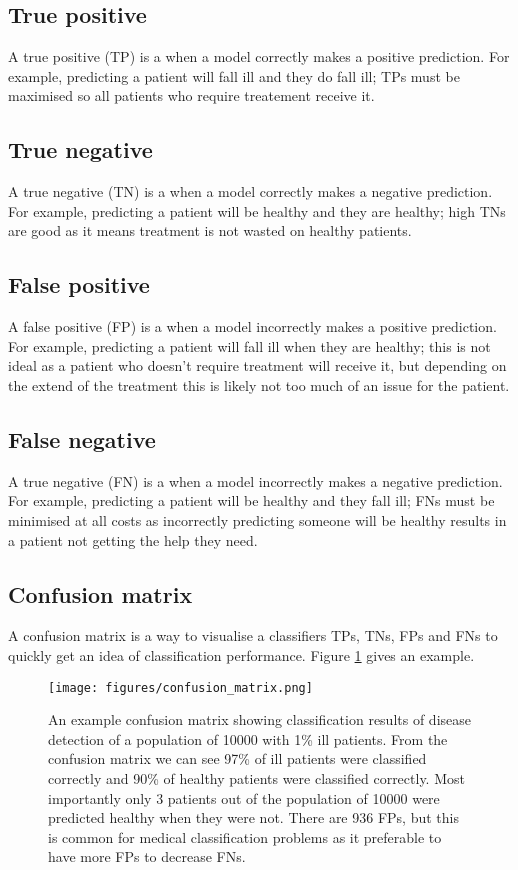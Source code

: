 \documentclass[
    author={Kai Hulme},
    supervisor={Dr Jon Bird},
    degree={BSc},
    title={Generative Adversarial Networks as an Augmentation Technique},
    subtitle={for Alzheimer's Disease Detection in MRI Volumes},
    type={Research},
    year={2021} 
]{dissertation}
\begin{document}
\subsection{True positive}

A true positive (TP) is a when a model correctly makes a positive prediction. For example, predicting a patient will fall ill and they do fall ill; TPs must be maximised so all patients who require treatement receive it.

\subsection{True negative}

A true negative (TN) is a when a model correctly makes a negative prediction. For example, predicting a patient will be healthy and they are healthy; high TNs are good as it means treatment is not wasted on healthy patients.

\subsection{False positive}

A false positive (FP) is a when a model incorrectly makes a positive prediction. For example, predicting a patient will fall ill when they are healthy; this is not ideal as a patient who doesn't require treatment will receive it, but depending on the extend of the treatment this is likely not too much of an issue for the patient.

\subsection{False negative}

A true negative (FN) is a when a model incorrectly makes a negative prediction. For example, predicting a patient will be healthy and they fall ill; FNs must be minimised at all costs as incorrectly predicting someone will be healthy results in a patient not getting the help they need.

\subsection{Confusion matrix}

A confusion matrix is a way to visualise a classifiers TPs, TNs, FPs and FNs to quickly get an idea of classification performance. Figure \ref{confusion_matrix} gives an example.

\begin{figure}[t]
\centering
\texttt{[image: figures/confusion\_matrix.png]}
\caption{An example confusion matrix showing classification results of disease detection of a population of 10000 with 1\% ill patients. From the confusion matrix we can see 97\% of ill patients were classified correctly and 90\% of healthy patients were classified correctly. Most importantly only 3 patients out of the population of 10000 were predicted healthy when they were not. There are 936 FPs, but this is common for medical classification problems as it preferable to have more FPs to decrease FNs.}
\label{confusion_matrix}
\end{figure}
\end{document}
